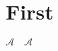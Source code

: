 \documentclass[a4paper,11pt]{book}
\begin{document}
\chapter{First}

$\mathcal{A}\quad\mathscr{A}$
\end{document}
